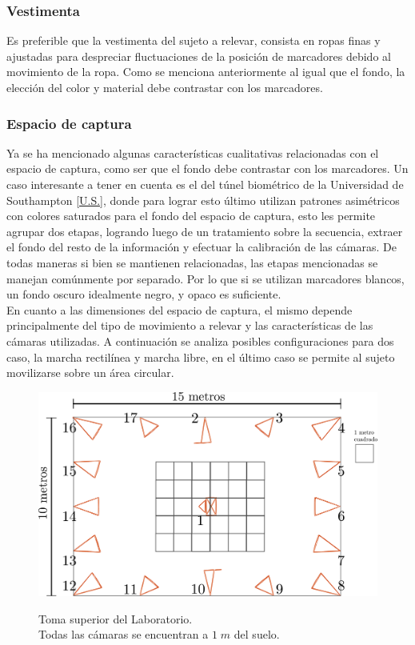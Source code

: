 \subsubsection{Vestimenta}
Es preferible que la vestimenta del sujeto a relevar, consista en ropas finas y ajustadas para despreciar fluctuaciones de la posición de marcadores debido al movimiento de la ropa. Como se menciona anteriormente al igual que el fondo, la elección del color y material debe contrastar con los marcadores.

\subsubsection{Espacio de captura}

Ya se ha mencionado algunas características cualitativas relacionadas con el espacio de captura, como ser que el fondo debe contrastar con los marcadores. Un caso interesante a tener en cuenta es el del túnel biométrico de la Universidad de Southampton \ref{U.S.}, donde para lograr esto último utilizan patrones asimétricos con colores saturados para el fondo del espacio de captura, esto les permite agrupar dos etapas, logrando luego de un tratamiento sobre la secuencia, extraer el fondo del resto de la información y efectuar la calibración de las cámaras. De todas maneras si bien se mantienen relacionadas, las etapas mencionadas se manejan comúnmente por separado. Por lo que si se utilizan marcadores blancos, un fondo oscuro idealmente negro, y opaco es suficiente.\\

En cuanto a las dimensiones del espacio de captura, el mismo depende principalmente del tipo de movimiento a relevar y las características de las cámaras utilizadas. A continuación se analiza posibles configuraciones para dos caso, la marcha rectilínea y marcha libre, en el último caso se permite al sujeto movilizarse sobre un área circular.


\begin{figure}[!ht]
  \centering
  {\includegraphics[scale=0.2]{img/Base_Datos/Laboratorio.pdf}}      
  \caption{Toma superior del Laboratorio.\\ Todas las cámaras se encuentran a $1\;m$ del suelo.}
  \label{img_Laboratorio}
\end{figure}  
 
